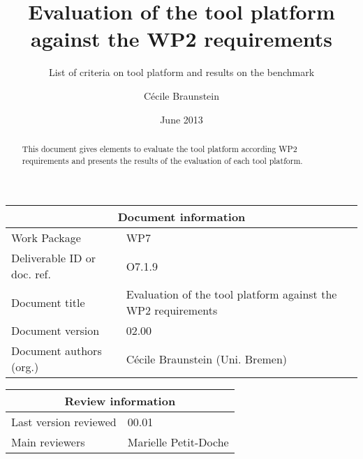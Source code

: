 \documentclass{openetcs_report}
\begin{document}
\frontmatter
{}




\title{Evaluation of the tool platform against the WP2 requirements }

\subtitle{List of criteria on tool platform and results on the benchmark}

\date{June 2013}


\author{C\'ecile Braunstein}

 


\begin{abstract}
This document gives elements to evaluate the tool platform according
WP2 requirements and presents the results of the evaluation of each
tool platform.
\end{abstract}

\maketitle
\tableofcontents
\listoffiguresandtables
\newpage


\begin{tabular}{|p{4.4cm}|p{8.7cm}|}
\hline
\multicolumn{2}{|c|}{Document information} \\
\hline
Work Package &  WP7  \\
Deliverable ID or doc. ref. & O7.1.9\\
\hline
Document title & Evaluation of the tool platform against the WP2 requirements \\
Document version & 02.00 \\
Document authors (org.)  & C\'ecile Braunstein (Uni. Bremen)  \\
\hline
\end{tabular}

\begin{tabular}{|p{4.4cm}|p{8.7cm}|}
\hline
\multicolumn{2}{|c|}{Review information} \\
\hline
Last version reviewed & 00.01 \\
\hline
Main reviewers & Marielle Petit-Doche\\
 \hline
\end{tabular}
\end{document}

